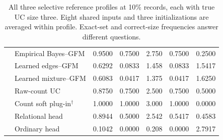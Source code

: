\begin{table}[ht]
\begin{tabular*}{\linewidth}{@{\extracolsep{\fill}}llrrrrr@{}}
 & Empirical Bayes--GFM & 0.9500 & 0.7500 & 2.750 & 0.7500 & 0.2500\\
 & Learned edges--GFM & 0.6292 & 0.0833 & 1.458 & 0.0833 & 1.5417\\
 & Learned mixture--GFM & 0.6083 & 0.0417 & 1.375 & 0.0417 & 1.6250\\
 & Raw-count UC & 0.8750 & 0.7500 & 2.500 & 0.7500 & 0.5000\\
 & Count soft plug-in$^{\dagger}$ & 1.0000 & 1.0000 & 3.000 & 1.0000 & 0.0000\\
 & Relational head & 0.8944 & 0.5000 & 2.542 & 0.5417 & 0.4583\\
 & Ordinary head & 0.1042 & 0.0000 & 0.208 & 0.0000 & 2.7917\\
\bottomrule\end{tabular*}
\caption{All three selective reference profiles at 10\% records, each with true UC size three. Eight shared inputs and three initializations are averaged within profile. Exact-set and correct-size frequencies answer different questions.}\label{tab:posterior-native-selective}\end{table}

